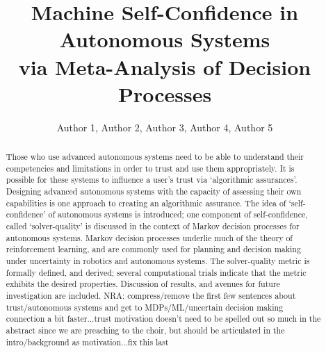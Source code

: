 \documentclass[sigconf,authordraft]{acmart}
\newcommand{\hlr}[1]{{\color{red} #1}}
\newcommand{\nisar}[1]{\hlr{NRA: #1}}
\begin{document}
\title{Machine Self-Confidence in Autonomous Systems \\ via  Meta-Analysis of Decision Processes}%
\author{Author 1, Author 2, Author 3, Author 4, Author 5} %
\begin{abstract}
    Those who use advanced autonomous systems need to be able to understand their competencies and limitations in order to trust and use them appropriately. It is possible for these systems to influence a user's trust via `algorithmic assurances'. Designing advanced autonomous systems with the capacity of assessing their own capabilities is one approach to creating an algorithmic assurance. The idea of `self-confidence' of autonomous systems is introduced; one component of self-confidence, called `solver-quality' is discussed in the context of Markov decision processes for autonomous systems. Markov decision processes underlie much of the theory of reinforcement learning, and are commonly used for planning and decision making under uncertainty in robotics and autonomous systems. The solver-quality metric is formally defined, and derived; several computational trials indicate that the metric exhibits the desired properties. Discussion of results, and avenues for future investigation are included. \nisar{compress/remove the first few sentences about trust/autonomous systems and get to MDPs/ML/uncertain decision making connection a bit faster...trust motivation doesn't need to be spelled out so much in the abstract since we are preaching to the choir, but should be articulated in the intro/background as motivation...fix this last}
\end{abstract}
\maketitle









\end{document}
